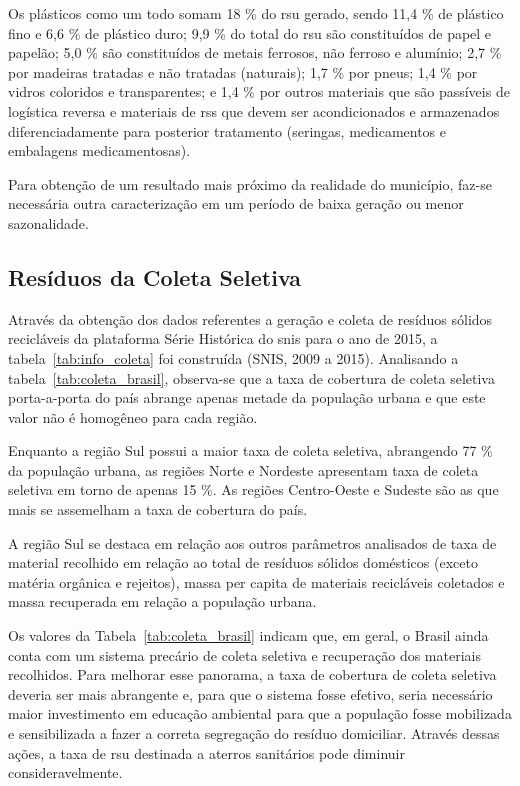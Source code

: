 Os plásticos como um todo somam 18 \% do \gls{rsu} gerado, sendo 11,4 \% de plástico fino e 6,6 \% de plástico duro; 9,9 \% do total do \gls{rsu} são constituídos de papel e papelão; 5,0 \% são constituídos de metais ferrosos, não ferroso e alumínio; 2,7 \% por madeiras tratadas e não tratadas (naturais); 1,7 \% por pneus; 1,4 \% por vidros coloridos e transparentes; e 1,4 \% por outros materiais que são passíveis de logística reversa e  materiais de \gls{rss} que devem ser acondicionados e armazenados diferenciadamente para posterior tratamento (seringas, medicamentos e embalagens medicamentosas).

Para obtenção de um resultado mais próximo da realidade do município, faz-se necessária outra caracterização em um período de baixa geração ou menor sazonalidade.

\subsection{Resíduos da Coleta Seletiva}
\label{subsec:res_coleta_seletiva}

Através da obtenção dos dados referentes a geração e coleta de resíduos sólidos recicláveis da plataforma Série Histórica do \gls{snis} para o ano de 2015, a tabela~\ref{tab:info_coleta} foi construída (SNIS, 2009 a 2015). Analisando a tabela~\ref{tab:coleta_brasil}, observa-se que a taxa de cobertura de coleta seletiva porta-a-porta do país abrange apenas metade da população urbana e que este valor não é homogêneo para cada região.

Enquanto a região Sul possui a maior taxa de coleta seletiva, abrangendo 77 \% da população urbana, as regiões Norte e Nordeste apresentam taxa de coleta seletiva em torno de apenas 15 \%. As regiões Centro-Oeste e Sudeste são as que mais se assemelham a taxa de cobertura do país.

A região Sul se destaca em relação aos outros parâmetros analisados de taxa de material recolhido em relação ao total de resíduos sólidos domésticos (exceto matéria orgânica e rejeitos), massa per capita de materiais recicláveis coletados e massa recuperada em relação a população urbana.



Os valores da Tabela~\ref{tab:coleta_brasil} indicam que, em geral, o Brasil ainda conta com um sistema precário de coleta seletiva e recuperação dos materiais recolhidos. Para melhorar esse panorama, a taxa de cobertura de coleta seletiva deveria ser mais abrangente e, para que o sistema fosse efetivo, seria necessário maior investimento em educação ambiental para que a população fosse mobilizada e sensibilizada a fazer a correta segregação do resíduo domiciliar. Através dessas ações, a taxa de \gls{rsu} destinada a aterros sanitários pode diminuir consideravelmente.

